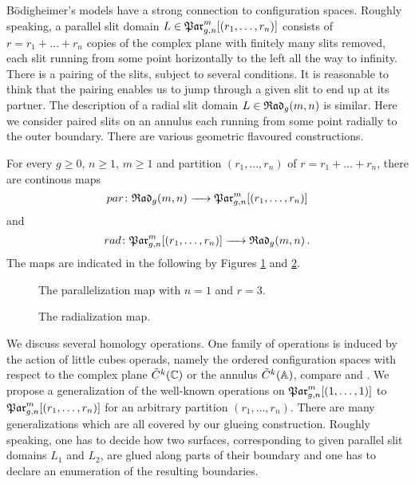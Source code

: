 Bödigheimer's models have a strong connection to configuration spaces.
Roughly speaking, a parallel slit domain $L \in \Parr$ consists of $r = r_1 + \ldots + r_n$ copies of the complex plane with finitely many slits removed,
each slit running from some point horizontally to the left all the way to infinity.
There is a pairing of the slits, subject to several conditions.
It is reasonable to think that the pairing enables us to jump through a given slit to end up at its partner.
The description of a radial slit domain $L \in {\mathfrak{Rad}_g(m,n)}$ is similar.
Here we consider paired slits on an annulus each running from some point radially to the outer boundary.
There are various geometric flavoured constructions.
\begin{prop*}[Bödigheimer]
    For every $g \ge 0$, $n \ge 1$, $m \ge 1$ and partition $(r_1, \ldots, r_n)$ of $r = r_1 + \ldots + r_n$,
    there are continous maps
    \[
        par \colon \Rad \to \Parr
    \]
    and
    \[
        rad \colon \Parr \to \Rad \,.
    \]
    The maps are indicated in the following by Figures \ref{intro:parallelization} and \ref{intro:radialization}.
\end{prop*}
\begin{figure}[ht]
    \centering
    \caption{\label{intro:parallelization}The parallelization map with $n=1$ and $r = 3$.}
\end{figure}
\begin{figure}[ht]
    \centering
    \caption{\label{intro:radialization}The radialization map.}
\end{figure}
We discuss several homology operations.
One family of operations is induced by the action of little cubes operads, namely
the ordered configuration spaces with respect to the complex plane ${\tilde C^{k}} (\mathbb C)$ or the annulus ${\tilde C^{k}} (\mathbb A)$, compare \cite{Boedigheimer19902} and \cite{Boedigheimer2006}.
We propose a generalization of the well-known operations on $\Par_{g,n}^m[(1, \ldots, 1)]$ to $\Parr$ for an arbitrary partition $(r_1, \ldots, r_n)$.
There are many generalizations which are all covered by our glueing construction.
Roughly speaking, one has to decide how two surfaces, corresponding to given parallel slit domains $L_1$ and $L_2$, are glued along parts of their boundary and
one has to declare an enumeration of the resulting boundaries.
